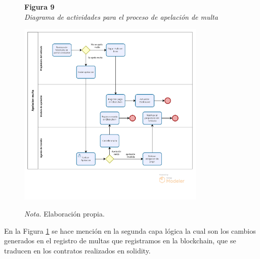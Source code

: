  \begin{figure}[htbp]
    \begin{flushleft}
        \textbf{Figura 9}\\[2em]
        \textit{Diagrama de actividades para el proceso de apelación de multa}
    \end{flushleft}
    \vspace{1em}
    \centering
    \includegraphics[width=0.8\textwidth]{Images/ActApelacion.png}
    \vspace{2em}
    \begin{flushleft}
        \textit{Nota.} Elaboración propia.
    \end{flushleft}
    \label{fig:diagrama_apelacion}
\end{figure}

En la Figura \ref{fig:diagrama_apelacion} se hace mención en la segunda capa lógica la cual son los cambios generados en el registro de multas que registramos en la blockchain, que se traducen en los contratos realizados en solidity.

